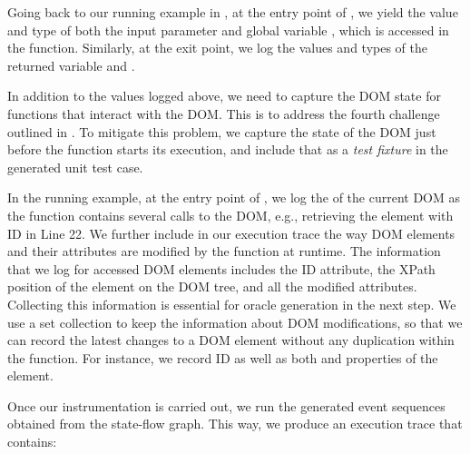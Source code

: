 Going back to our running example in , at the entry point of , we yield the value and type of both the input parameter  and global variable , which is accessed in the function. Similarly, at the exit point, we log the values and types of the returned variable  and .

In addition to the values logged above, we need to capture the DOM state for functions that interact with the DOM. This is to address the fourth challenge outlined in .
To mitigate this problem, we capture the state of the DOM just before the function starts its execution, and include that as a \emph{test fixture} in the generated unit test case.

In the running example, at the entry point of  , we log the  of the current DOM as the function contains several calls to the DOM, e.g., retrieving the element with ID  in Line 22. We further include in our execution trace the way DOM elements and their attributes are modified by the \javascript function at runtime. 
The information that we log for accessed DOM elements includes the ID attribute, the XPath position of the element on the DOM tree, and all the modified  attributes. Collecting this information is essential for oracle generation in the next step.
%
We use a set collection to keep the information about DOM modifications, so that we can record the latest changes to a DOM element without any duplication within the function. 
For instance, we record ID as well as both  and  properties of the  element. 

Once our instrumentation is carried out, we run the generated event sequences obtained from the state-flow graph. This way, we produce an execution trace that contains:
 
